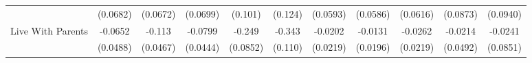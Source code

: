 {\begin{tabular}{l*{10}{c}}
            &    (0.0682)         &    (0.0672)         &    (0.0699)         &     (0.101)         &     (0.124)         &    (0.0593)         &    (0.0586)         &    (0.0616)         &    (0.0873)         &    (0.0940)         \\
\addlinespace
Live With Parents&     -0.0652         &      -0.113\sym{*}  &     -0.0799         &      -0.249\sym{**} &      -0.343\sym{**} &     -0.0202         &     -0.0131         &     -0.0262         &     -0.0214         &     -0.0241         \\
            &    (0.0488)         &    (0.0467)         &    (0.0444)         &    (0.0852)         &     (0.110)         &    (0.0219)         &    (0.0196)         &    (0.0219)         &    (0.0492)         &    (0.0851)         \\
\bottomrule
\end{tabular}
}
